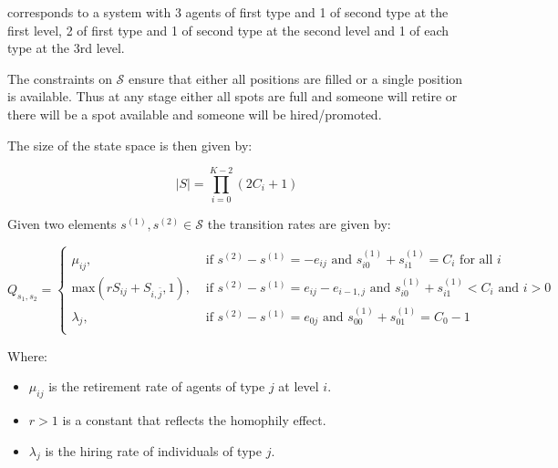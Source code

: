 \documentclass{article}
\renewcommand{\S}{\mathcal{S}}
\begin{document}
corresponds to a system with 3 agents of first type and 1 of second type at the
first level, 2 of first type and 1 of second type at the second level and 1 of
each type at the 3rd level.

The constraints on \(\S\) ensure that either all positions are filled or a
single position is available. Thus at any stage either all spots are full and
someone will retire or there will be a spot available and someone will be
hired/promoted.

The size of the state space is then given by:

\begin{equation}
    |S| = \prod_{i=0}^{K - 2}\left(2C_i + 1\right)
\end{equation}

Given two elements \(s^{(1)}, s^{(2)}\in \S\) the transition rates are given by:

\begin{equation}\label{eqn:transition_rates}
    Q_{s_1, s_2} =
        \begin{cases}
            \mu_{ij},& \text{ if }s^{(2)} - s^{(1)} = -e_{ij}
            \text{ and }s^{(1)}_{i0} + s^{(1)}_{i1} = C_i\text{ for all }i\\
           \text{max}(rS_{ij} + S_{i, \bar j}, 1),& \text{ if }s^{(2)} - s^{(1)} = e_{ij} - e_{i-1, j}
                                     \text{ and }s^{(1)}_{i0} + s^{(1)}_{i1} < C_{i}
                                     \text{ and }i > 0\\
           \lambda_{j},&\text{ if }s^{(2)} - s^{(1)} = e_{0j}
                        \text{ and }s^{(1)}_{00} + s^{(1)}_{01} = C_{0} - 1\\
        \end{cases}
\end{equation}

Where:

\begin{itemize}
    \item \(\mu_{ij}\) is the retirement rate of agents of type \(j\) at level
        \(i\).
    \item \(r > 1\) is a constant that reflects the homophily effect.
    \item \(\lambda_j\) is the hiring rate of individuals of type \(j\).
\end{itemize}

\end{document}
